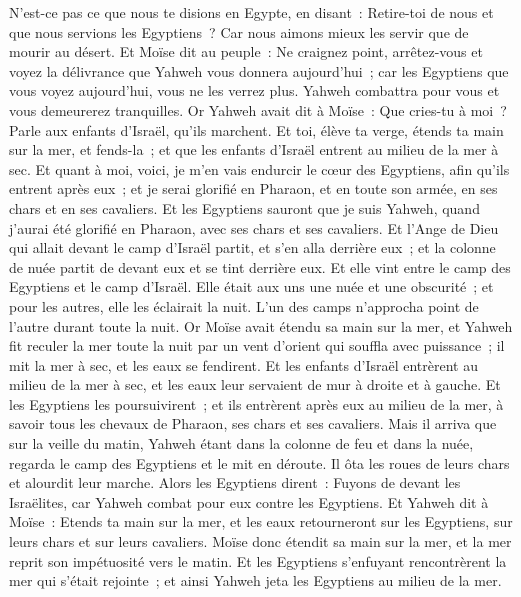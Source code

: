 \begin{multicols}{2}
N'est-ce pas ce que nous te disions en Egypte, en disant~: Retire-toi de nous et que nous servions les Egyptiens~? Car nous aimons mieux les servir que de mourir au désert.
Et Moïse dit au peuple~: Ne craignez point, arrêtez-vous et voyez la délivrance que Yahweh vous donnera aujourd'hui~; car les Egyptiens que vous voyez aujourd'hui, vous ne les verrez plus.
Yahweh combattra pour vous et vous demeurerez tranquilles.
Or Yahweh avait dit à Moïse~: Que cries-tu à moi~? Parle aux enfants d'Israël, qu'ils marchent.
Et toi, élève ta verge, étends ta main sur la mer, et fends-la~; et que les enfants d'Israël entrent au milieu de la mer à sec.
 Et quant à moi, voici, je m'en vais endurcir le cœur des Egyptiens, afin qu'ils entrent après eux~; et je serai glorifié en Pharaon, et en toute son armée, en ses chars et en ses cavaliers.
Et les Egyptiens sauront que je suis Yahweh, quand j'aurai été glorifié en Pharaon, avec ses chars et ses cavaliers.
Et l'Ange de Dieu qui allait devant le camp d'Israël partit, et s'en alla derrière eux~; et la colonne de nuée partit de devant eux et se tint derrière eux.
Et elle vint entre le camp des Egyptiens et le camp d'Israël. Elle était aux uns une nuée et une obscurité~; et pour les autres, elle les éclairait la nuit. L'un des camps n'approcha point de l'autre durant toute la nuit.
Or Moïse avait étendu sa main sur la mer, et Yahweh fit reculer la mer toute la nuit par un vent d'orient qui souffla avec puissance~; il mit la mer à sec, et les eaux se fendirent.
Et les enfants d'Israël entrèrent au milieu de la mer à sec, et les eaux leur servaient de mur à droite et à gauche.
Et les Egyptiens les poursuivirent~; et ils entrèrent après eux au milieu de la mer, à savoir tous les chevaux de Pharaon, ses chars et ses cavaliers.
Mais il arriva que sur la veille du matin, Yahweh étant dans la colonne de feu et dans la nuée, regarda le camp des Egyptiens et le mit en déroute.
Il ôta les roues de leurs chars et alourdit leur marche. Alors les Egyptiens dirent~: Fuyons de devant les Israëlites, car Yahweh combat pour eux contre les Egyptiens.
Et Yahweh dit à Moïse~: Etends ta main sur la mer, et les eaux retourneront sur les Egyptiens, sur leurs chars et sur leurs cavaliers.
Moïse donc étendit sa main sur la mer, et la mer reprit son impétuosité vers le matin. Et les Egyptiens s'enfuyant rencontrèrent la mer qui s'était rejointe~; et ainsi Yahweh jeta les Egyptiens au milieu de la mer.

\end{multicols}
